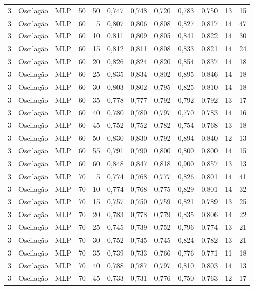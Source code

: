 \begin{longtable}{ccclrrrrrrrr}
3 & Oscilação & MLP & 50 & 50 & 0,747 & 0,748 & 0,720 & 0,783 & 0,750 & 13 & 15 \\
3 & Oscilação & MLP & 60 & 5 & 0,807 & 0,806 & 0,808 & 0,827 & 0,817 & 14 & 47 \\
3 & Oscilação & MLP & 60 & 10 & 0,811 & 0,809 & 0,805 & 0,841 & 0,822 & 14 & 30 \\
3 & Oscilação & MLP & 60 & 15 & 0,812 & 0,811 & 0,808 & 0,833 & 0,821 & 14 & 24 \\
3 & Oscilação & MLP & 60 & 20 & 0,826 & 0,824 & 0,820 & 0,854 & 0,837 & 14 & 18 \\
3 & Oscilação & MLP & 60 & 25 & 0,835 & 0,834 & 0,802 & 0,895 & 0,846 & 14 & 18 \\
3 & Oscilação & MLP & 60 & 30 & 0,803 & 0,802 & 0,795 & 0,825 & 0,810 & 14 & 18 \\
3 & Oscilação & MLP & 60 & 35 & 0,778 & 0,777 & 0,792 & 0,792 & 0,792 & 13 & 17 \\
3 & Oscilação & MLP & 60 & 40 & 0,780 & 0,780 & 0,797 & 0,770 & 0,783 & 14 & 16 \\
3 & Oscilação & MLP & 60 & 45 & 0,752 & 0,752 & 0,782 & 0,754 & 0,768 & 13 & 18 \\
3 & Oscilação & MLP & 60 & 50 & 0,830 & 0,830 & 0,792 & 0,894 & 0,840 & 12 & 13 \\
3 & Oscilação & MLP & 60 & 55 & 0,791 & 0,790 & 0,800 & 0,800 & 0,800 & 14 & 15 \\
3 & Oscilação & MLP & 60 & 60 & 0,848 & 0,847 & 0,818 & 0,900 & 0,857 & 13 & 13 \\
3 & Oscilação & MLP & 70 & 5 & 0,774 & 0,768 & 0,777 & 0,826 & 0,801 & 14 & 41 \\
3 & Oscilação & MLP & 70 & 10 & 0,774 & 0,768 & 0,775 & 0,829 & 0,801 & 14 & 32 \\
3 & Oscilação & MLP & 70 & 15 & 0,757 & 0,750 & 0,759 & 0,821 & 0,789 & 13 & 25 \\
3 & Oscilação & MLP & 70 & 20 & 0,783 & 0,778 & 0,779 & 0,835 & 0,806 & 14 & 22 \\
3 & Oscilação & MLP & 70 & 25 & 0,745 & 0,739 & 0,752 & 0,796 & 0,774 & 13 & 21 \\
3 & Oscilação & MLP & 70 & 30 & 0,752 & 0,745 & 0,745 & 0,824 & 0,782 & 13 & 21 \\
3 & Oscilação & MLP & 70 & 35 & 0,739 & 0,733 & 0,766 & 0,776 & 0,771 & 11 & 18 \\
3 & Oscilação & MLP & 70 & 40 & 0,788 & 0,787 & 0,797 & 0,810 & 0,803 & 14 & 13 \\
3 & Oscilação & MLP & 70 & 45 & 0,733 & 0,731 & 0,776 & 0,750 & 0,763 & 12 & 17 \\

\end{longtable}
